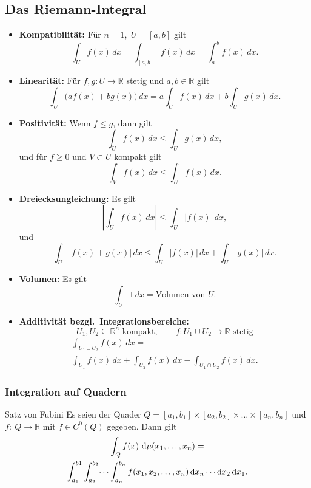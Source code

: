 \documentclass[a4paper,10pt]{article}
\def\R{\mathbb{R}}
\begin{document}
\subsection{Das Riemann-Integral}

\begin{itemize}
    \item \textbf{Kompatibilität:} Für \(n=1,\; U=[a,b]\) gilt
    \[
        \int_U f(x)\,dx
        = \int_{[a,b]} f(x)\,dx
        = \int_a^{b} f(x)\,dx .
    \]
    
    \item \textbf{Linearität:} Für \(f,g:U\to\mathbb{R}\) stetig und \(a,b\in\mathbb{R}\) gilt
    \[
        \int_U \big(a f(x)+b g(x)\big)\,dx
        = a\int_U f(x)\,dx + b\int_U g(x)\,dx .
    \]
    
    \item \textbf{Positivität:} Wenn \(f\le g\), dann gilt
    \[
        \int_U f(x)\,dx \le \int_U g(x)\,dx ,
    \]
    und für \(f\ge 0\) und \(V\subset U\) kompakt gilt
    \[
        \int_V f(x)\,dx \le \int_U f(x)\,dx .
    \]
    
    \item \textbf{Dreiecksungleichung:} Es gilt
    \[
        \left| \int_U f(x)\,dx \right|
        \le \int_U |f(x)|\,dx ,
    \]
    und
    \[
        \int_U |f(x)+g(x)|\,dx
        \le \int_U |f(x)|\,dx + \int_U |g(x)|\,dx .
    \]
    
    \item \textbf{Volumen:} Es gilt
    \[
        \int_U 1 \, dx = \text{Volumen von } U .
    \]
    
    \item \textbf{Additivität bezgl.\ Integrationsbereiche:}
    \[
        U_1,U_2 \subseteq \mathbb{R}^n \text{ kompakt}, \qquad
        f: U_1 \cup U_2 \to \mathbb{R} \text{ stetig}
    \]
    \begin{multline*}
        \int_{U_1 \cup U_2} f(x)\,dx
        = \\ \int_{U_1} f(x)\,dx
        + \int_{U_2} f(x)\,dx
        - \int_{U_1 \cap U_2} f(x)\,dx .
    \end{multline*}
\end{itemize}


\subsubsection{Integration auf Quadern}

\begin{mainbox}{Satz von Fubini}
    Es seien der Quader \( Q = [a_1, b_1] \times [a_2, b_2] \times \dots \times [a_n, b_n] \) und \( f: \: Q \to \R \) mit \( f \in C^0(Q) \) gegeben. Dann gilt \begin{multline*}
        \int_Q f(x) \, \odif{{\mu(x_1, \dots, x_n)}} = \\
        \int_{a_1}^{b1} \int_{a_2}^{b_2} \dots \int_{a_n}^{b_n} f(x_1, x_2, \dots, x_n) \odif{x_n} \cdots \odif{x_2} \odif{x_1} \text{.}
    \end{multline*}
\end{mainbox}
\end{document}

